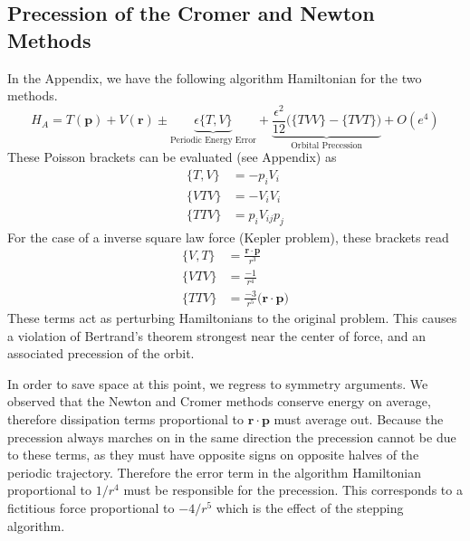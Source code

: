 \documentclass[8pt,a4paper]{article}
\begin{document}
	\subsection{Precession of the Cromer and Newton Methods}
	In the Appendix, we have the following algorithm Hamiltonian for the two methods.
	\begin{equation}
		H_A = T(\mathbf{p}) + V(\mathbf{r}) \pm \underbrace{\epsilon\{T,V\}}_{\text{Periodic Energy Error}} + \underbrace{\frac{\epsilon^2}{12}\Big(\{TVV\} - \{TVT\}\Big)}_{\text{Orbital Precession}}  + O(e^4)
	\end{equation}
	These Poisson brackets can be evaluated (see Appendix) as
	\begin{align}
		\{T,V\} &= - p_iV_i \\
		\{VTV\} &= -V_iV_i \\
		\{TTV\} &= p_i V_{ij} p_j
	\end{align}
	For the case of a inverse square law force (Kepler problem), these brackets read
	\begin{align}
		\{V,T\} &= \frac{\mathbf{r}\cdot \mathbf{p}}{r^3} \\
		\{VTV\} &= \frac{-1}{r^4} \\
		\{TTV\} &= \frac{-3}{r^5}\big(\mathbf{r} \cdot \mathbf{p}\big)
	\end{align}
	These terms act as perturbing Hamiltonians to the original problem. This causes a violation of Bertrand's theorem strongest near the center of force, and an associated precession of the orbit.
	
	In order to save space at this point, we regress to symmetry arguments. We observed that the Newton and Cromer methods conserve energy on average, therefore dissipation terms proportional to $\mathbf{r}\cdot\mathbf{p}$ must average out. Because the precession always marches on in the same direction the precession cannot be due to these terms, as they must have opposite signs on opposite halves of the periodic trajectory. Therefore the error term in the algorithm Hamiltonian proportional to $1/r^4$ must be responsible for the precession. This corresponds to a fictitious force proportional to $-4/r^5$ which is the effect of the stepping algorithm.
	
\end{document}
